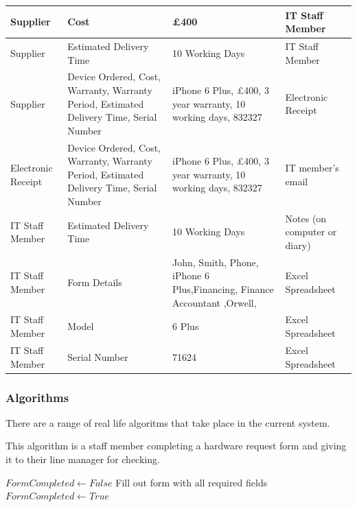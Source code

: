 \begin{center}
\begin{tabular}{|p{3cm}|p{3cm}|p{4cm}|p{3cm}|}
Supplier & Cost & £400 &IT Staff Member \\ \hline
Supplier & Estimated Delivery Time & 10 Working Days & IT Staff Member \\ \hline
Supplier & Device Ordered, Cost, Warranty, Warranty Period, Estimated Delivery Time, Serial Number & iPhone 6 Plus, £400, 3 year warranty, 10 working days, 832327 & Electronic Receipt \\ \hline
Electronic Receipt  & Device Ordered, Cost, Warranty, Warranty Period, Estimated Delivery Time, Serial Number & iPhone 6 Plus, £400, 3 year warranty, 10 working days, 832327 & IT member's email \\ \hline
IT Staff Member & Estimated Delivery Time & 10 Working Days & Notes (on computer or diary) \\ \hline
IT Staff Member                      & Form Details   & John, Smith, Phone, iPhone 6 Plus,Financing,  Finance Accountant ,Orwell, & Excel Spreadsheet                                   \\ \hline
IT Staff Member                             & Model                              & 6 Plus                                             & Excel Spreadsheet                                       \\ \hline
IT Staff Member                       & Serial Number                      & 71624                                          &  Excel Spreadsheet           \\ \hline
\end{tabular}
\end{center}

\newpage
\subsubsection{Algorithms}

There are a range of real life algoritms that take place in the current system.

This algorithm is a staff member completing a hardware request form and giving it to their line manager for checking.

\begin{algorithm}[H]
\begin{algorithmic}
\State $FormCompleted  \leftarrow False$
	\State Fill out form with all required fields
	\State $FormCompleted \leftarrow True$
\Else
\EndIf
\end{algorithmic}
\end{algorithm}

